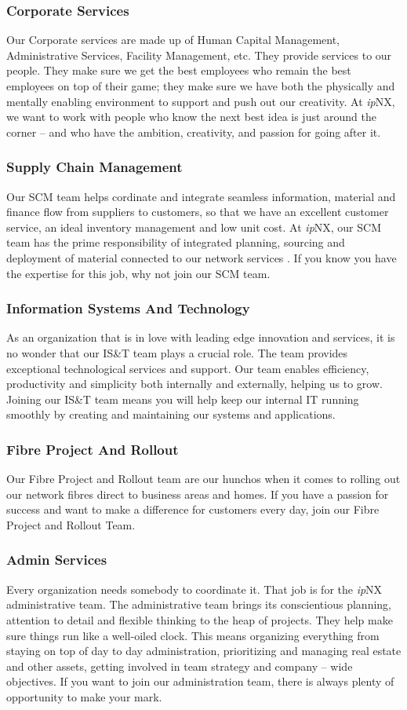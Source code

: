 \subsubsection{Corporate Services}
Our Corporate services are made up of Human Capital Management, Administrative Services, Facility Management, etc. They provide services to our people. They make sure we get the best employees who remain the best employees on top of their game; they make sure we have both the physically and mentally enabling environment to support and push out our creativity. At \textit{ip}NX, we want to work with people who know the next best idea is just around the corner – and who have the ambition, creativity, and passion for going after it.
\subsubsection{Supply Chain Management}
Our SCM team helps cordinate and integrate  seamless information, material and finance flow from suppliers to customers, so that we have an excellent customer service, an ideal inventory management and low unit cost. At \textit{ip}NX, our SCM team has the prime responsibility of integrated planning, sourcing and deployment of material connected to our network services . If you know you have the expertise for this job, why not join our SCM team.
\subsubsection{Information Systems And Technology}
As an organization that is in love with leading edge innovation and services, it is no wonder that our IS\&T team plays a crucial role. The team provides exceptional technological services and support. Our team enables efficiency, productivity and simplicity both internally and externally, helping us to grow. Joining our IS\&T team means you will help keep our internal IT running smoothly by creating and maintaining our systems and applications.
\subsubsection{Fibre Project And Rollout}
Our Fibre Project and Rollout team are our hunchos when it comes to rolling out our network fibres direct to business areas and homes. If you have a passion for  success and want to make a difference for customers every day, join our Fibre Project and Rollout Team.
\subsubsection{Admin Services}
Every organization needs somebody to coordinate it. That job is for the \textit{ip}NX administrative team. The administrative team brings its conscientious planning, attention to detail and flexible thinking to the heap of projects. They help make sure things run like a well-oiled clock. This means organizing everything from staying on top of day to day administration, prioritizing and managing real estate and other assets, getting involved in team strategy and company – wide objectives. If you want to join our administration team, there is always plenty of opportunity to make your mark.
